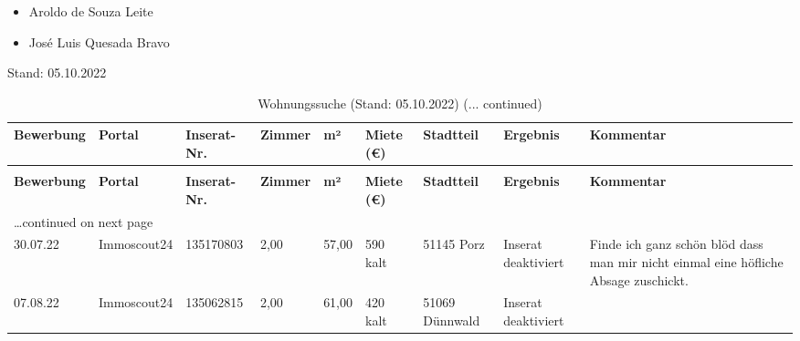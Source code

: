 \documentclass[a4paper]{article}
\newlength{\DUtablewidth} %
\begin{document}


\begin{itemize}
\item Aroldo de Souza Leite

\item José Luis Quesada Bravo
\end{itemize}

Stand: 05.10.2022

\setlength{\DUtablewidth}{\linewidth}%
\begin{longtable}[l]{|p{0.108\DUtablewidth}|p{0.108\DUtablewidth}|p{0.108\DUtablewidth}|p{0.108\DUtablewidth}|p{0.108\DUtablewidth}|p{0.108\DUtablewidth}|p{0.108\DUtablewidth}|p{0.108\DUtablewidth}|p{0.108\DUtablewidth}|}
\caption{Wohnungssuche (Stand: 05.10.2022)}\\
\hline
\textbf{%
Bewerbung
} & \textbf{%
Portal
} & \textbf{%
Inserat-Nr.
} & \textbf{%
Zimmer
} & \textbf{%
m²
} & \textbf{%
Miete (€)
} & \textbf{%
Stadtteil
} & \textbf{%
Ergebnis
} & \textbf{%
Kommentar
} \\
\hline
\endfirsthead
\caption[]{Wohnungssuche (Stand: 05.10.2022) (... continued)}\\
\hline
\textbf{%
Bewerbung
} & \textbf{%
Portal
} & \textbf{%
Inserat-Nr.
} & \textbf{%
Zimmer
} & \textbf{%
m²
} & \textbf{%
Miete (€)
} & \textbf{%
Stadtteil
} & \textbf{%
Ergebnis
} & \textbf{%
Kommentar
} \\
\hline
\endhead
\multicolumn{9}{p{0.97\DUtablewidth}}{\raggedleft\ldots continued on next page}\\
\endfoot
\endlastfoot

30.07.22
 & 
Immoscout24
 & 
135170803
 & 
2,00
 & 
57,00
 & 
590 kalt
 & 
51145 Porz
 & 
Inserat deaktiviert
 & 
Finde ich ganz schön blöd
dass man mir nicht einmal
eine höfliche Absage zuschickt.
 \\
\hline

07.08.22
 & 
Immoscout24
 & 
135062815
 & 
2,00
 & 
61,00
 & 
420 kalt
 & 
51069 Dünnwald
 & 
Inserat deaktiviert
 &  \\
\hline
\end{longtable}
\end{document}
